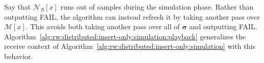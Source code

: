 \documentclass[10]{report}
\newcommand{\push}[1]{\text{push} \left ( #1 \right )}
\newcommand{\algoname}[1]{\textnormal{\textsc{#1}}}
\begin{document}
\begin{algorithm}[htbp]
\begin{flushleft}
\begin{algorithmic}[1]
\end{algorithmic}
\end{flushleft}
\end{algorithm}

Say that $\mathcal{N}_\mathcal{B}[x]$ runs out of samples during the simulation phase. 
Rather than outputting FAIL, the algorithm can instead refresh it by taking another pass over $\mathcal{M}[x]$.
This avoids both taking another pass over all of $\boldsymbol{\sigma}$ and outputting FAIL.
Algorithm~\ref{alg:rw:distributed:insert-only:simulation:playback} generalizes the receive context of Algorithm~\ref{alg:rw:distributed:insert-only:simulation} with this behavior.
\end{document}
